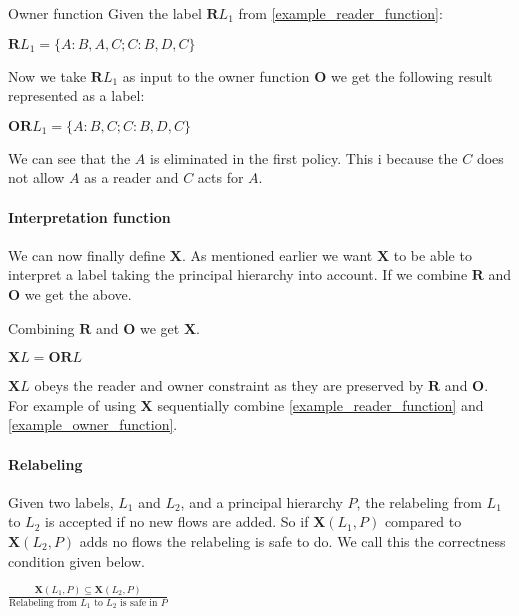 \begin{example}{Owner function}\label{example_owner_function}
  Given the label $\textbf{R}L_1$ from \cref{example_reader_function}:
  \begin{center}
    $\textbf{R}L_1 = \{A:B,A,C; C:B,D,C\}$
  \end{center}
  Now we take $\textbf{R}L_1$ as input to the owner function $\textbf{O}$ we get the following result represented as a label:
  \begin{center}
    $\textbf{OR}L_1 = \{A:B,C; C:B,D,C\}$
  \end{center}
  We can see that the $A$ is eliminated in the first policy.
  This i because the $C$ does not allow $A$ as a reader and $C$ acts for $A$. 
\end{example}

\paragraph{Interpretation function}
We can now finally define $\textbf{X}$.
As mentioned earlier we want $\textbf{X}$ to be able to interpret a label taking the principal hierarchy into account.
If we combine $\textbf{R}$ and $\textbf{O}$ we get the above.
\begin{definition}
  Combining $\textbf{R}$ and $\textbf{O}$ we get $\textbf{X}$.
  \begin{center}
    $\textbf{X}L = \textbf{OR}L$
  \end{center}
\end{definition}
$\textbf{X}L$ obeys the reader and owner constraint as they are preserved by $\textbf{R}$ and $\textbf{O}$.
For example of using $\textbf{X}$ sequentially combine \cref{example_reader_function} and \cref{example_owner_function}.

\paragraph{Relabeling}
Given two labels, $L_1$ and $L_2$, and a principal hierarchy $P$, the relabeling from $L_1$ to $L_2$ is accepted if no new flows are added.
So if $\textbf{X}(L_1, P)$ compared to $\textbf{X}(L_2, P)$ adds no flows the relabeling is safe to do.
We call this the correctness condition given below.
\begin{definition}
  \begin{center}
    $\frac{\textbf{X}(L_1, P)\subseteq \textbf{X}(L_2,P)}{\text{Relabeling from } L_1 \text{ to } L_2 \text{ is safe in } P }$
  \end{center}
\end{definition}

